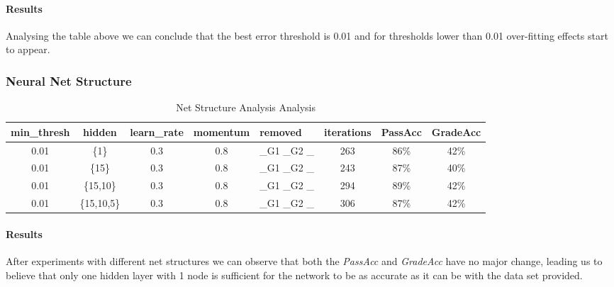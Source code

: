 \documentclass[11pt]{article}
\begin{document}
\paragraph{Results}
Analysing the table above we can conclude that the best error threshold is 0.01 and for thresholds lower than 0.01 over-fitting effects start to appear.
\subsubsection{Neural Net Structure}
\begin{table}[h]
\begin{tabular}{| c | c | c | c | p{3cm} | c | c | c |}
\hline \textbf{min\_thresh} & \textbf{hidden} & \textbf{learn\_rate} & \textbf{momentum} & \textbf{removed} & \textbf{iterations} & \textbf{PassAcc} & \textbf{GradeAcc}\\
\hline 0.01 & \{1\} & 0.3 & 0.8 & \_G1 \_G2 \_ & 263 & 86\% & 42\%\\
\hline 0.01 & \{15\} & 0.3 & 0.8 & \_G1 \_G2 \_ & 243 & 87\% & 40\%\\
\hline 0.01 & \{15,10\} & 0.3 & 0.8 & \_G1 \_G2 \_ & 294 & 89\% & 42\%\\
\hline 0.01 & \{15,10,5\} & 0.3 & 0.8 & \_G1 \_G2 \_ & 306 & 87\% & 42\%\\
\hline
\end{tabular}
\caption{Net Structure Analysis Analysis}
\end{table}
\paragraph{Results}
After experiments with different net structures we can observe that both the \textit{PassAcc} and \textit{GradeAcc} have no major change, leading us to believe that only one hidden layer with 1 node is sufficient for the network to be as accurate as it can be with the data set provided.
\end{document}
